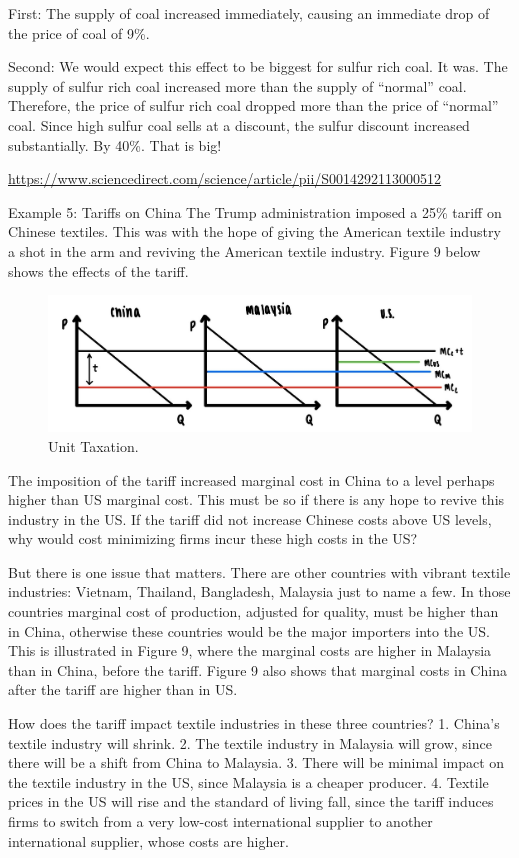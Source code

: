 \documentclass[
]{book}
\begin{document}
First: The supply of coal increased immediately, causing an immediate drop of the price of coal of 9\%.

Second: We would expect this effect to be biggest for sulfur rich coal. It was. The supply of sulfur rich coal increased more than the supply of ``normal'' coal. Therefore, the price of sulfur rich coal dropped more than the price of ``normal'' coal. Since high sulfur coal sells at a discount, the sulfur discount increased substantially. By 40\%. That is big!

\url{https://www.sciencedirect.com/science/article/pii/S0014292113000512}

Example 5: Tariffs on China
The Trump administration imposed a 25\% tariff on Chinese textiles. This was with the hope of giving the American textile industry a shot in the arm and reviving the American textile industry. Figure 9 below shows the effects of the tariff.

\begin{figure}

{\centering \includegraphics[width=0.5\linewidth]{img/ch5/fig9} 

}

\caption{Unit Taxation.}\label{fig:fig509}
\end{figure}

The imposition of the tariff increased marginal cost in China to a level perhaps higher than US marginal cost. This must be so if there is any hope to revive this industry in the US. If the tariff did not increase Chinese costs above US levels, why would cost minimizing firms incur these high costs in the US?

But there is one issue that matters. There are other countries with vibrant textile industries: Vietnam, Thailand, Bangladesh, Malaysia just to name a few. In those countries marginal cost of production, adjusted for quality, must be higher than in China, otherwise these countries would be the major importers into the US. This is illustrated in Figure 9, where the marginal costs are higher in Malaysia than in China, before the tariff. Figure 9 also shows that marginal costs in China after the tariff are higher than in US.

How does the tariff impact textile industries in these three countries?
1. China's textile industry will shrink.
2. The textile industry in Malaysia will grow, since there will be a shift from China to Malaysia.
3. There will be minimal impact on the textile industry in the US, since Malaysia is a cheaper producer.
4. Textile prices in the US will rise and the standard of living fall, since the tariff induces firms to switch from a very low-cost international supplier to another international supplier, whose costs are higher.
\end{document}
